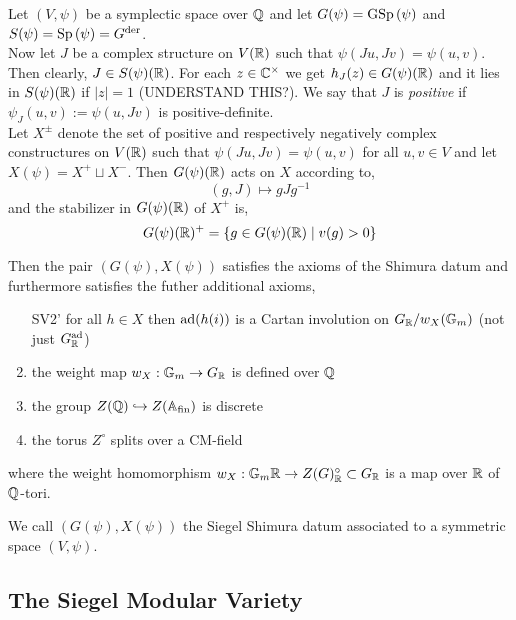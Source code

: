 \documentclass[12pt]{article}
\begin{document}
Let $(V, \psi)$ be a symplectic space over $\mathbb{Q}$ and let $G(\psi) = \mathrm{GSp}\left( \psi \right)$ and $S(\psi) = \mathrm{Sp}\left( \psi \right) = G^{\mathrm{der}}$. 
\bigskip\\
Now let $J$ be a complex structure on $V(\mathbb{R})$ such that $\psi(Ju, Jv) = \psi(u,v)$. Then clearly, $J \in S(\psi)(\mathbb{R})$. For each $z \in \mathbb{C}^\times$ we get $h_J(z) \in G(\psi)(\mathbb{R})$ and it lies in $S(\psi)(\mathbb{R})$ if $|z| = 1$ (UNDERSTAND THIS?). We say that $J$ is \textit{positive} if $\psi_J(u, v) := \psi(u, Jv)$ is positive-definite. 
\bigskip\\
Let $X^{\pm}$ denote the set of positive and respectively negatively complex constructures on $V(\mathbb{R})$ such that $\psi(J u, J v) = \psi(u, v)$ for all $u, v \in V$ and let $X(\psi) = X^{+} \sqcup X^{-}$. Then $G(\psi)(\mathbb{R})$ acts on $X$ according to,
\[ (g, J) \mapsto g J g^{-1} \]
and the stabilizer in $G(\psi)(\mathbb{R})$ of $X^{+}$ is,
\[ G(\psi)(\mathbb{R})^+ = \{ g \in G(\psi)(\mathbb{R}) \mid v(g) > 0 \} \]

\begin{prop}
Then the pair $(G(\psi), X(\psi))$ satisfies the axioms of the Shimura datum and furthermore satisfies the futher additional axioms,
\begin{enumerate}
\item[SV2'] for all $h \in X$ then $\mathrm{ad}(h(i))$ is a Cartan involution on $G_{\mathbb{R}} / w_X(\mathbb{G}_m)$ (not just $G_{\mathbb{R}}^{\mathrm{ad}}$)
\item the weight map $w_X : \mathbb{G}_m \to G_{\mathbb{R}}$ is defined over $\mathbb{Q}$
\item the group $Z(\mathbb{Q}) \hookrightarrow Z(\mathbb{A}_{\mathrm{fin}})$ is discrete
\item the torus $Z^\circ$ splits over a CM-field 
\end{enumerate}
where the weight homomorphism $w_X : \mathbb{G}_m{\mathbb{R}} \to Z(G)_{\mathbb{R}}^\circ \subset G_{\mathbb{R}}$ is a map over $\mathbb{R}$ of $\mathbb{Q}$-tori.
\end{prop}

\begin{rmk}
We call $(G(\psi), X(\psi))$ the Siegel Shimura datum associated to a symmetric space $(V, \psi)$. 
\end{rmk}

\subsection{The Siegel Modular Variety}
\end{document}

